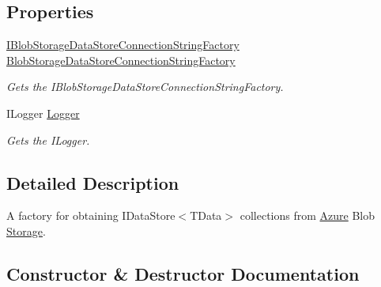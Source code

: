 \subsection*{Properties}
\begin{DoxyCompactItemize}
\item 
\hyperlink{interfaceCqrs_1_1Azure_1_1BlobStorage_1_1DataStores_1_1IBlobStorageDataStoreConnectionStringFactory}{I\+Blob\+Storage\+Data\+Store\+Connection\+String\+Factory} \hyperlink{classCqrs_1_1Azure_1_1BlobStorage_1_1Factories_1_1BlobStorageDataStoreFactory_a5df6d152d265ee439183ef60b3deb666_a5df6d152d265ee439183ef60b3deb666}{Blob\+Storage\+Data\+Store\+Connection\+String\+Factory}
\begin{DoxyCompactList}\small\item\em Gets the I\+Blob\+Storage\+Data\+Store\+Connection\+String\+Factory. \end{DoxyCompactList}\item 
I\+Logger \hyperlink{classCqrs_1_1Azure_1_1BlobStorage_1_1Factories_1_1BlobStorageDataStoreFactory_a18a5d0c661d5fd43c075a7c926aedf0f_a18a5d0c661d5fd43c075a7c926aedf0f}{Logger}
\begin{DoxyCompactList}\small\item\em Gets the I\+Logger. \end{DoxyCompactList}\end{DoxyCompactItemize}


\subsection{Detailed Description}
A factory for obtaining I\+Data\+Store$<$\+T\+Data$>$ collections from \hyperlink{namespaceCqrs_1_1Azure}{Azure} Blob \hyperlink{namespaceCqrs_1_1Azure_1_1Storage}{Storage}. 



\subsection{Constructor \& Destructor Documentation}
\mbox{\label{classCqrs_1_1Azure_1_1BlobStorage_1_1Factories_1_1BlobStorageDataStoreFactory_a448e77623db63d7a66fc6b6c75466eac_a448e77623db63d7a66fc6b6c75466eac}} 
